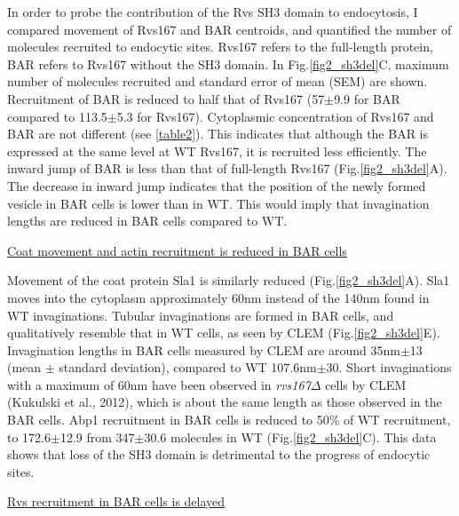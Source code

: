 In order to probe the contribution of the Rvs SH3 domain to endocytosis, I compared movement of Rvs167 and BAR centroids, and quantified the number of molecules recruited to endocytic sites. Rvs167 refers to the full-length protein, BAR refers to Rvs167 without the SH3 domain. In Fig.\ref{fig2_sh3del}C, maximum number of molecules recruited and standard error of mean (SEM) are shown. Recruitment of BAR is reduced to half that of Rvs167 (57$\pm$9.9 for BAR compared to 113.5$\pm$5.3 for Rvs167). Cytoplasmic concentration of Rvs167 and BAR are not different (see \ref{table2}). This indicates that although the BAR is expressed at the same level at WT Rvs167, it is recruited less efficiently. 
The inward jump of BAR is less than that of full-length Rvs167 (Fig.\ref{fig2_sh3del}A). The decrease in inward jump indicates that the position of the newly formed vesicle in BAR cells is lower than in WT. This would imply that invagination lengths are reduced in BAR cells compared to WT.

	\vspace{5mm}
	\newpage
	\underline{Coat movement and actin recruitment is reduced in BAR cells}
	
Movement of the coat protein Sla1 is similarly reduced (Fig.\ref{fig2_sh3del}A). Sla1 moves into the cytoplasm approximately 60nm instead of the 140nm found in WT invaginations. Tubular invaginations are formed in BAR cells, and qualitatively resemble that in WT cells, as seen by CLEM  (Fig.\ref{fig2_sh3del}E). Invagination lengths in BAR cells measured by CLEM are around 35nm$\pm$13 (mean $\pm$ standard deviation), compared to WT 107.6nm$\pm$30. Short invaginations with a maximum of 60nm have been observed in  \textit{rvs167$\Delta$} cells  by CLEM (Kukulski et al., 2012), which is about the same length as those observed in the BAR cells. 
Abp1 recruitment in BAR cells is reduced to 50\% of WT recruitment, to 172.6$\pm$12.9 from 347$\pm$30.6 molecules in WT (Fig.\ref{fig2_sh3del}C). This data shows that loss of the SH3 domain is detrimental to the progress of endocytic sites. 


	\vspace{5mm}
		\underline{Rvs recruitment in BAR cells is delayed}
		
